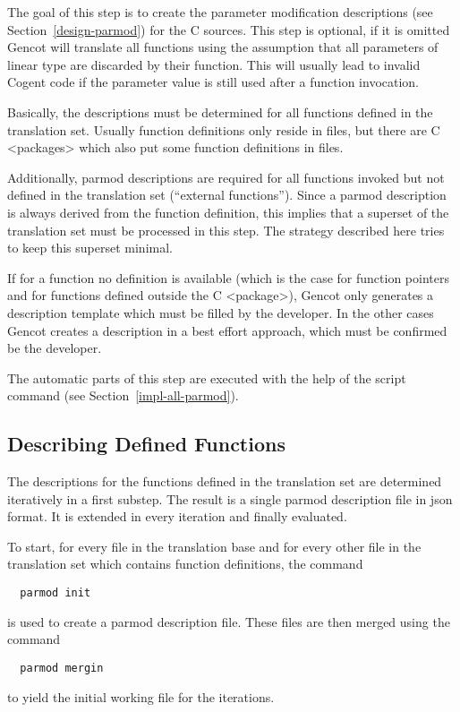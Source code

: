The goal of this step is to create the parameter modification descriptions (see Section~\ref{design-parmod})
for the C sources. This step is optional, if it is omitted Gencot will translate all functions using the 
assumption that all parameters of linear type are discarded by their function. This will usually lead to
invalid Cogent code if the parameter value is still used after a function invocation.

Basically, the descriptions must be determined for all functions defined in the translation
set. Usually function definitions only reside in  files, but there are C <packages> which also put 
some function definitions in  files.

Additionally, parmod descriptions are required for all functions invoked but not defined in
the translation set (``external functions''). Since a parmod description is always derived from the function 
definition, this implies that a superset of the translation set must be processed in this step. The strategy 
described here tries to keep this superset minimal. 

If for a function no definition is available (which is the case for function pointers and for functions
defined outside the C <package>), Gencot only generates a description template which must be filled by the
developer. In the other cases Gencot creates a description in a best effort approach, which must be confirmed
be the developer.

The automatic parts of this step are executed with the help of the script command  (see 
Section~\ref{impl-all-parmod}).

\subsection{Describing Defined Functions}
\label{app-parmod-defined}

The descriptions for the functions defined in the translation set are determined iteratively in a first substep. 
The result is a single parmod description file in json format. It is extended in every iteration and finally
evaluated.

To start, for every file in the translation base and for every other file in the translation set which contains
function definitions, the command
\begin{verbatim}
  parmod init
\end{verbatim}
is used to create a parmod description file. These files are then merged using the command
\begin{verbatim}
  parmod mergin
\end{verbatim}
to yield the initial working file for the iterations. 

